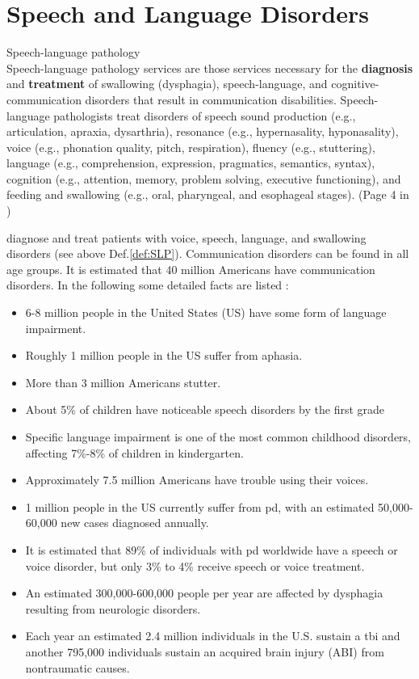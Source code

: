 \section{Speech and Language Disorders}
\label{sec:SLP}

\theoremstyle{definition}
\begin{definition}{Speech-language pathology\\}
Speech-language pathology services are those services necessary for the \textbf{diagnosis} and \textbf{treatment} of swallowing (\gls{dysphagia}), speech-language, and cognitive-communication disorders that result in communication disabilities. Speech-language pathologists treat disorders of speech sound production (e.g., articulation, \gls{apraxia}, \gls{dysarthria}), resonance (e.g., hypernasality, hyponasality), voice (e.g., phonation quality, pitch, respiration), fluency (e.g., stuttering), language (e.g., comprehension, expression, pragmatics, semantics, syntax), cognition (e.g., attention, memory, problem solving, executive functioning), and feeding and swallowing (e.g., oral, pharyngeal, and esophageal stages). (Page 4 in \cite{SLPathologies})
\label{def:SLP}
\end{definition}

 diagnose and treat patients with voice, speech, language, and swallowing disorders (see above Def.\ref{def:SLP}). Communication disorders can be found in all age groups. It is estimated that 40 million Americans have communication disorders. In the following some detailed facts are listed \cite{SLPathologies}:

\begin{itemize}
\item 6-8 million people in the United States (US) have some form of language impairment.
\item Roughly 1 million people in the US suffer from aphasia. 
\item More than 3 million Americans stutter. 
\item About 5\% of children have noticeable speech disorders by the first grade 
\item Specific language impairment is one of the most common childhood disorders, affecting 7\%-8\% of children in kindergarten. 
\item Approximately 7.5 million Americans have trouble using their voices.
\item 1 million people in the US currently suffer from \gls{pd}, with an estimated 50,000-60,000 new cases diagnosed annually. 
\item It is estimated that 89\% of individuals with \gls{pd} worldwide have a speech or voice disorder, but only 3\% to 4\% receive speech or voice treatment. 
\item An estimated 300,000-600,000 people per year are affected by \gls{dysphagia} resulting from neurologic disorders. 
\item Each year an estimated 2.4 million individuals in the U.S. sustain a \gls{tbi} and another 795,000 individuals sustain an acquired brain injury (ABI) from nontraumatic causes.
\end{itemize}

